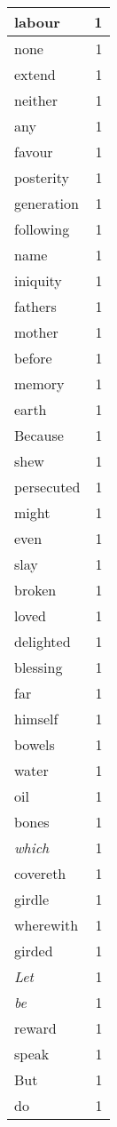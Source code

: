 \begin{center}
\begin{longtable}{l|r}
labour & 1 \\ \hline
none & 1 \\ \hline
extend & 1 \\ \hline
neither & 1 \\ \hline
any & 1 \\ \hline
favour & 1 \\ \hline
posterity & 1 \\ \hline
generation & 1 \\ \hline
following & 1 \\ \hline
name & 1 \\ \hline
iniquity & 1 \\ \hline
fathers & 1 \\ \hline
mother & 1 \\ \hline
before & 1 \\ \hline
memory & 1 \\ \hline
earth & 1 \\ \hline
Because & 1 \\ \hline
shew & 1 \\ \hline
persecuted & 1 \\ \hline
might & 1 \\ \hline
even & 1 \\ \hline
slay & 1 \\ \hline
broken & 1 \\ \hline
loved & 1 \\ \hline
delighted & 1 \\ \hline
blessing & 1 \\ \hline
far & 1 \\ \hline
himself & 1 \\ \hline
bowels & 1 \\ \hline
water & 1 \\ \hline
oil & 1 \\ \hline
bones & 1 \\ \hline
\emph{which} & 1 \\ \hline
covereth & 1 \\ \hline
girdle & 1 \\ \hline
wherewith & 1 \\ \hline
girded & 1 \\ \hline
\emph{Let} & 1 \\ \hline
\emph{be} & 1 \\ \hline
reward & 1 \\ \hline
speak & 1 \\ \hline
But & 1 \\ \hline
do & 1 \\ \hline

\end{longtable}
\end{center}
